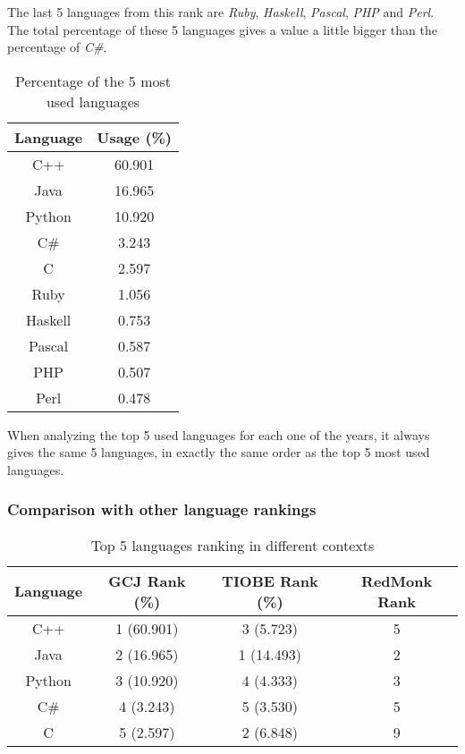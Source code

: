 \documentclass{article}
\begin{document}
\begin{multicols*}{2}
The last 5 languages from this rank are \textit{Ruby}, \textit{Haskell}, \textit{Pascal}, \textit{PHP} and \textit{Perl}. The total percentage of these 5 languages gives a value a little bigger than the percentage of \textit{C\#}.

\begin{table}[H]
\centering
\caption{Percentage of the 5 most used languages}
\label{lang_perc}
\begin{tabular}{c|c}
\textbf{Language} & \textbf{Usage (\%)} \\ \hline
C++               & 60.901       \\
Java              & 16.965       \\
Python            & 10.920       \\
C\#               & 3.243        \\
C                 & 2.597        \\
Ruby              & 1.056        \\
Haskell           & 0.753        \\
Pascal            & 0.587        \\
PHP               & 0.507        \\
Perl              & 0.478
\end{tabular}
\end{table}

When analyzing the top 5 used languages for each one of the years, it always gives the same 5 languages, in exactly the same order as the top 5 most used languages.


\subsubsection{Comparison with other language rankings}

\begin{table*}[!ht]
\centering
\caption{Top 5 languages ranking in different contexts}
\label{diff_contexts}
\begin{tabular}{c|c|c|c}
\textbf{Language} & \textbf{GCJ Rank (\%)} & \textbf{TIOBE Rank (\%)} & \textbf{RedMonk Rank} \\ \hline
C++               & 1 (60.901)             & 3 (5.723)                & 5                     \\
Java              & 2 (16.965)             & 1 (14.493)               & 2                     \\
Python            & 3 (10.920)             & 4 (4.333)                & 3                     \\
C\#               & 4 (3.243)              & 5 (3.530)                & 5                     \\
C                 & 5 (2.597)              & 2 (6.848)                & 9
\end{tabular}
\end{table*}


\end{multicols*}
\end{document}
